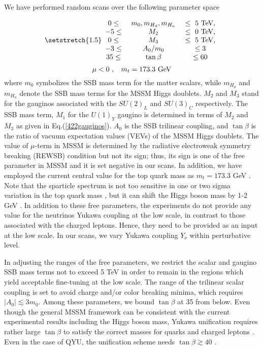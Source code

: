 \documentclass[12pt]{article}
\begin{document}
We have performed random scans over the following parameter space 

\begin{equation}
\setstretch{1.5}
\begin{array}{ccc}
0 \leq &  ~ m_{0},m_{H_{d}},m_{H_{u}} ~  &  \leq ~ 5~{\rm TeV}, \\
-5 \leq &  ~ M_{2}~&\leq ~ 0~{\rm TeV}, \\
0 \leq &  ~ 	M_{3}~&\leq ~ 5~{\rm TeV}, \\
-3  \leq & A_{0}/m_{0} &\leq 3  \\
 35  \leq & \tan\beta & \leq 60
 \end{array}
\label{paramSpace}
\end{equation}
\begin{equation*}
\mu < 0~,\hspace{0.3cm} m_{t}=173.3~{\rm GeV}
\end{equation*}
where $m_{0}$ symbolizes the SSB mass term for the matter scalars, while $m_{H_{d}}$ and $m_{H_{u}}$ denote the SSB mass terms for the MSSM Higgs doublets. $M_2$ and $M_3$  stand for the gauginos associated with the $SU(2)_{L}$ and $SU(3)_{C}$ respectively. The SSB mass term, $M_{1}$ for the $U(1)_{Y}$ gaugino is determined in terms of $M_{2}$ and $M_{3}$ as given in Eq.(\ref{422gauginos}). $A_0$ is the SSB trilinear coupling, and $\tan\beta$ is the ratio of vacuum expectation values (VEVs) of the MSSM Higgs doublets. The value of $\mu$-term in MSSM is determined by the radiative electroweak symmetry breaking (REWSB) condition but not its sign; thus, its sign is one of the free parameter in MSSM and it is set negative in our scans. In addition, we have employed the current central value for the top quark mass as $m_t=173.3$ GeV \cite{Group:2009ad}. Note that the sparticle spectrum is not too sensitive in one or two sigma variation in the top quark mass \cite{Gogoladze:2011db}, but it can shift the Higgs boson mass by 1-2 GeV \cite{Gogoladze:2011aa}.  In addition to these free parameters, the experiments do not provide any value for the neutrinos Yukawa coupling at the low scale, in contrast to those associated with the charged leptons. Hence, they need to be provided as an input at the low scale. In our scans, we vary Yukawa coupling $Y_{\nu}$ within perturbative level.

In adjusting the ranges of the free parameters, we restrict the scalar and gaugino SSB mass terms not to exceed 5 TeV in order to remain in the regions which yield acceptable fine-tuning at the low scale. The range of the trilinear scalar coupling is set to avoid charge and/or color breaking minima, which requires $|A_{0}|\lesssim 3m_{0}$. Among these parameters, we bound $\tan\beta$ at 35 from below. Even though the general MSSM framework can be consistent with the current experimental results including the Higgs boson mass, Yukawa unification requires rather large $\tan\beta$ to satisfy the correct masses for quarks and charged leptons \cite{bigger-422}. Even in the case of QYU, the unification scheme needs $\tan\beta \gtrsim 40$ \cite{Dar:2011sj}.
\end{document}
